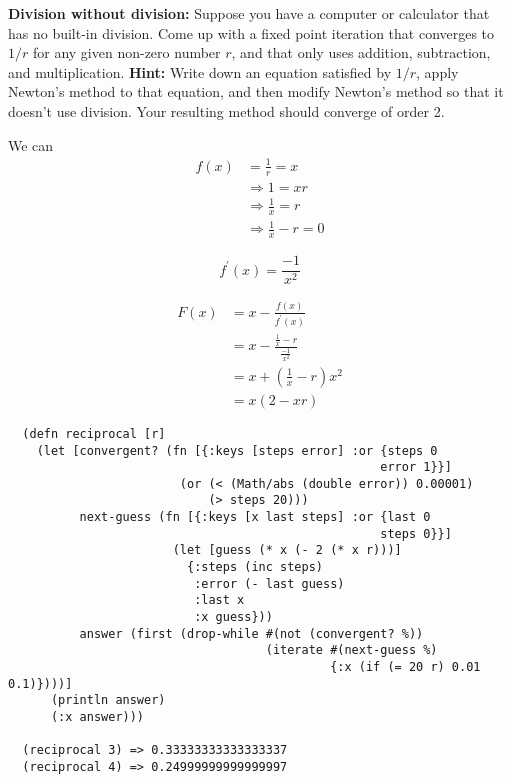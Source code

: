 \textbf{Division without division:} Suppose you have a computer or calculator that has no built-in division. Come up with a fixed point iteration that converges to $1/r$ for any given non-zero number $r$, and that only uses addition, subtraction, and multiplication. \textbf{Hint:} Write down an equation satisfied by $1/r$, apply Newton's method to that equation, and then modify Newton's method so that it doesn't use division. Your resulting method should converge of order 2.

{\color{blue}

We can
\[
\begin{aligned}
f(x) &= \frac{1}{r} = x \\
&\Rightarrow 1 = xr \\
&\Rightarrow \frac{1}{x} = r \\
&\Rightarrow \frac{1}{x} - r = 0
\end{aligned}
\]

\[
f^\prime (x) = \frac{-1}{x^2}
\]

\[
\begin{aligned}
F(x) &= x - \frac{f(x)}{f^\prime(x)} \\
&= x - \frac{\frac{1}{x} - r}{\frac{-1}{x^2}} \\
&= x + \left(\frac{1}{x} - r\right) x^2 \\
&= x(2 - xr)
\end{aligned}
\]

}

\begin{verbatim}
  (defn reciprocal [r]
    (let [convergent? (fn [{:keys [steps error] :or {steps 0
                                                    error 1}}]
                        (or (< (Math/abs (double error)) 0.00001)
                            (> steps 20)))
          next-guess (fn [{:keys [x last steps] :or {last 0
                                                    steps 0}}]
                       (let [guess (* x (- 2 (* x r)))]
                         {:steps (inc steps)
                          :error (- last guess)
                          :last x
                          :x guess}))
          answer (first (drop-while #(not (convergent? %))
                                    (iterate #(next-guess %)
                                             {:x (if (= 20 r) 0.01 0.1)})))]
      (println answer)
      (:x answer)))

  (reciprocal 3) => 0.33333333333333337
  (reciprocal 4) => 0.24999999999999997
\end{verbatim}

